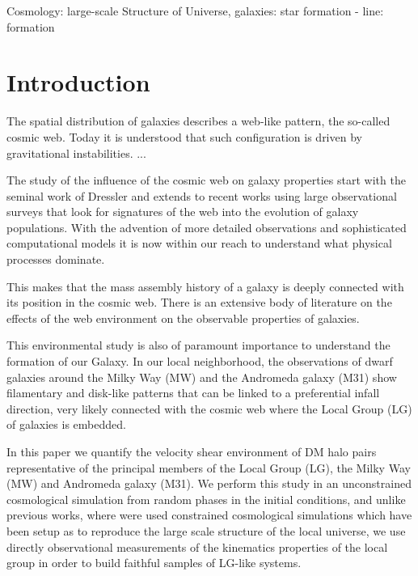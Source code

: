 \documentclass[a4,useAMS,usenatbib,usegraphicx]{latex/mn2e}
\begin{document}
\begin{keywords}
Cosmology: large-scale Structure of Universe, 
galaxies: star formation - line: formation
\end{keywords}



\section{Introduction}
\label{sec:introduction}


The spatial distribution of galaxies describes a web-like pattern, the 
so-called cosmic web. Today it is understood that such configuration is 
driven by gravitational instabilities. ...



The study of the influence of the cosmic web on galaxy properties start 
with the seminal work of Dressler  and extends to 
recent works using large observational surveys that look for signatures of 
the web into the evolution of galaxy populations. With the advention of 
more detailed observations and sophisticated computational models it is 
now within our reach to understand what physical processes dominate.



This makes  that the mass assembly history of a galaxy is deeply connected 
with its  position in the cosmic web. There is an extensive body of 
literature on the effects of the web environment on the observable 
properties of galaxies. 



This environmental study is also of paramount importance to understand the 
formation of our Galaxy. In our local neighborhood, the observations of 
dwarf galaxies around the Milky Way (MW) and the Andromeda galaxy (M31) 
show filamentary and disk-like patterns that can be linked to a 
preferential infall direction, very likely connected with the cosmic web 
where the Local Group (LG) of galaxies is embedded. 



In this paper we quantify the velocity shear environment of DM halo pairs
representative of the principal members of the Local Group (LG), the Milky
Way (MW) and Andromeda galaxy (M31). We perform this study in an 
unconstrained cosmological simulation from random phases in the initial 
conditions, and unlike previous works, where were used constrained 
cosmological simulations which have been setup as to reproduce the large 
scale structure of the local universe, we use directly observational 
measurements of the kinematics properties of the local group  in order to build faithful samples of LG-like systems.
\end{document}
